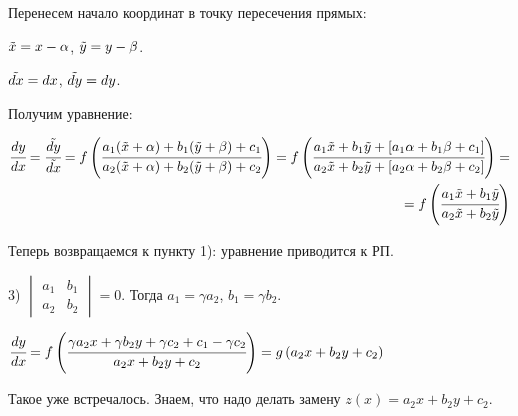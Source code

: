 Перенесем начало координат в точку пересечения прямых:

$\Tilde{x}=x - \alpha$, $\Tilde{y} = y - \beta$.

$\Tilde{dx} = dx$, $\Tilde{dy} = dy$.

Получим уравнение: 

\begin{eqnarray} \cfrac{dy}{dx} = \cfrac{\Tilde{dy}}{\Tilde{dx}} = f\left({\cfrac{a_1(\Tilde{x}+\alpha)+b_1(\Tilde{y}+\beta)+c_1}{a_2(\Tilde{x}+\alpha)+b_2(\Tilde{y}+\beta)+c_2}}\right) = f\left({\cfrac{a_1\Tilde{x}+b_1\Tilde{y}+[a_1\alpha+b_1\beta+c_1]}{a_2\Tilde{x}+b_2\Tilde{y}+[a_2\alpha+b_2\beta+c_2]}}\right) = \\
 = f\left({\cfrac{a_1\Tilde{x}+b_1\Tilde{y}}{a_2\Tilde{x}+b_2\Tilde{y}}}\right)
\end{eqnarray}
 

Теперь возвращаемся к пункту 1): уравнение приводится к РП.
\vspace{3mm}

3) $\begin{vmatrix}
  a_1& b_1\\
  a_2& b_2
\end{vmatrix} = 0$. Тогда $a_1=\gamma a_2$, $b_1 = \gamma b_2$.

$\cfrac{dy}{dx} = f\left({\cfrac{\gamma a_2 x + \gamma b_2 y + \gamma c_2 + c_1 - \gamma c_2}{a_2 x + b_2 y + c_2}}\right) = g\left({a_2x+b_2y+c_2}\right)$

Такое уже встречалось. Знаем, что надо делать замену $z(x) = a_2x+b_2y+c_2$.